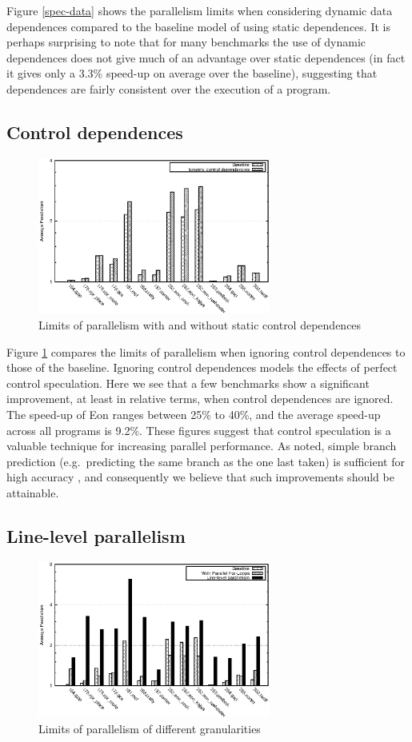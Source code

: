 Figure \ref{spec-data} shows the parallelism limits when considering dynamic data dependences compared to the baseline model of using static dependences.
It is perhaps surprising to note that for many benchmarks the use of dynamic dependences does not give much of an advantage over static dependences (in fact it gives only a 3.3\% speed-up on average over the baseline), suggesting that dependences are fairly consistent over the execution of a program.

\subsection{Control dependences}

\begin{figure}
 \centering
 \includegraphics[width=3in]{spec-ctl}
 \caption{Limits of parallelism with and without static control dependences}
 \label{spec-ctl}
\end{figure}

Figure \ref{spec-ctl} compares the limits of parallelism when ignoring control dependences to those of the baseline.
Ignoring control dependences models the effects of perfect control speculation.
Here we see that a few benchmarks show a significant improvement, at least in relative terms, when control dependences are ignored.
The speed-up of Eon ranges between 25\% to 40\%, and the average speed-up across all programs is 9.2\%.
These figures suggest that control speculation is a valuable technique for increasing parallel performance.
As noted, simple branch prediction (e.g.\ predicting the same branch as the one last taken) is sufficient for high accuracy \cite{smith98study}, and consequently we believe that such improvements should be attainable.

\subsection{Line-level parallelism}

\begin{figure}
 \centering
 \includegraphics[width=3in]{spec-gran}
 \caption{Limits of parallelism of different granularities}
 \label{spec-gran}
\end{figure}

